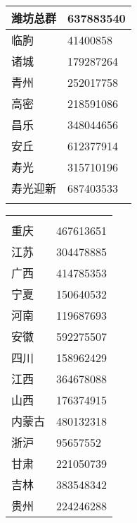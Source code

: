 {\begin{tabular}[t]{|w{c}{4em}|w{c}{6em}|}
        \Xhline{1.2pt}
        潍坊总群 & 637883540                \\
        \hline
        临朐   & 41400858                 \\
        \hline
        诸城   & 179287264                \\
        \hline
        青州   & 252017758                \\
        \hline
        高密   & 218591086                \\
        \hline
        昌乐   & 348044656                \\
        \hline
        安丘   & 612377914                \\
        \hline
        寿光   & 315710196                \\
        \hline
        寿光迎新 & 687403533                \\
        \Xhline{1.2pt}
    \end{tabular}%
    \qquad
    \begin{tabular}[t]{|w{c}{4em}|w{c}{6em}|}
        \Xhline{1.2pt}
         \\
        \Xhline{1.2pt}
        重庆   & 467613651                 \\
        \hline
        江苏   & 304478885                 \\
        \hline
        广西   & 414785353                 \\
        \hline
        宁夏   & 150640532                 \\
        \hline
        河南   & 119687693                 \\
        \hline
        安徽   & 592275507                 \\
        \hline
        四川   & 158962429                 \\
        \hline
        江西   & 364678088                 \\
        \hline
        山西   & 176374915                 \\
        \hline
        内蒙古  & 480132318                 \\
        \hline
        浙沪   & 95657552                  \\
        \hline
        甘肃   & 221050739                 \\
        \hline
        吉林   & 383548342                 \\
        \hline
        贵州   & 224246288                 \\

\end{tabular}}
